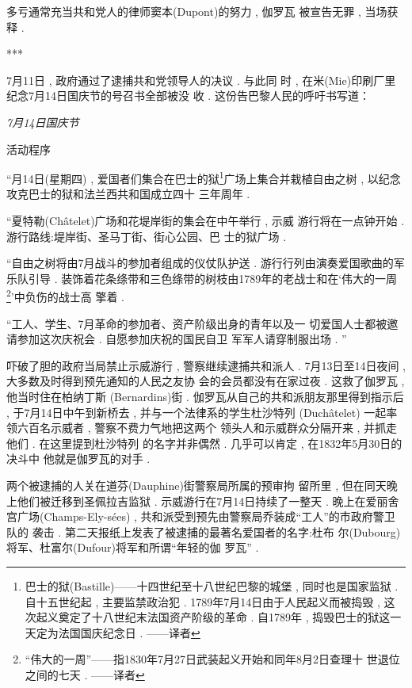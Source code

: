 多亏通常充当共和党人的律师窦本(Dupont)的努力 , 伽罗瓦 被宣告无罪 , 当场获释 . 

\begin{center}***
\end{center}

7月11日 , 政府通过了逮捕共和党领导人的决议 . 与此同 时 , 在米(Mie)印刷厂里纪念7月14日国庆节的号召书全部被没 收 . 这份告巴黎人民的呼吁书写道：

\begin{center}
	\emph{7月14日国庆节}
	
	活动程序
\end{center}

“月14日(星期四) , 爱国者们集合在巴士的狱\footnote{巴士的狱(Bastille)——十四世纪至十八世纪巴黎的城堡 , 同时也是国家监狱 . 自十五世纪起 , 主要监禁政治犯 . 1789年7月14日由于人民起义而被捣毁 , 这次起义奠定了十八世纪末法国资产阶级的革命 . 自1789年 , 捣毁巴士的狱这一天定为法国国庆纪念日 . ——译者}广场上集合并栽植自由之树 , 以纪念攻克巴士的狱和法兰西共和国成立四十 三年周年 . 

“夏特勒(Châtelet)广场和花堤岸街的集会在中午举行 , 示威 游行将在一点钟开始 . 游行路线:堤岸街、圣马丁街、街心公园、巴 士的狱广场 . 

“自由之树将由7月战斗的参加者组成的仪仗队护送 . 游行行列由演奏爱国歌曲的军乐队引导 . 装饰着花条绦带和三色绦带的树枝由1789年的老战士和在‘伟大的一周\footnote{“伟大的一周”——指1830年7月27日武装起义开始和同年8月2日查理十 世退位之间的七天 . ——译者}'中负伤的战士高 擎着 . 

“工人、学生、7月革命的参加者、资产阶级出身的青年以及一 切爱国人士都被邀请参加这次庆祝会 . 自愿参加庆祝的国民自卫 军军人请穿制服出场 . ”

\par

吓破了胆的政府当局禁止示威游行 , 警察继续逮捕共和派人 .  7月13日至14日夜间 , 大多数及时得到预先通知的人民之友协 会的会员都没有在家过夜 . 这救了伽罗瓦 , 他当时住在柏纳丁斯 (Bernardins)街 . 伽罗瓦从自己的共和派朋友那里得到指示后 ,  于7月14日中午到新桥去 , 并与一个法律系的学生杜沙特列 (Duchâtelet) 一起率领六百名示威者 , 警察不费力气地把这两个 领头人和示威群众分隔开来 , 并抓走他们 . 在这里提到杜沙特列 的名字并非偶然 . 几乎可以肯定 , 在1832年5月30日的决斗中 他就是伽罗瓦的对手 . 

两个被逮捕的人关在道芬(Dauphine)街警察局所属的预审拘 留所里 , 但在同天晚上他们被迁移到圣佩拉吉监狱 . 示威游行在7月14日持续了一整天 . 晚上在爱丽舍宫广场(Champs-Ely-sées) , 共和派受到预先由警察局乔装成“工人”的市政府警卫队的 袭击 . 第二天报纸上发表了被逮捕的最著名爱国者的名字:杜布 尔(Dubourg)将军、杜富尔(Dufour)将军和所谓“年轻的伽 罗瓦” . 

